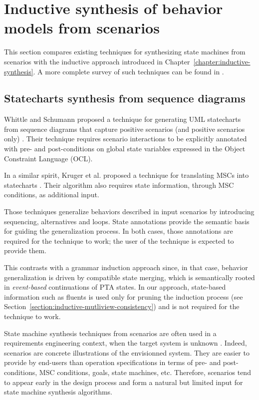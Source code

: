 \section{Inductive synthesis of behavior models from scenarios\label{section:related-from-scenarios}}

This section compares existing techniques for synthesizing state machines from scenarios with the inductive approach introduced in Chapter~\ref{chapter:inductive-synthesis}. A more complete survey of such techniques can be found in \cite{Liang:2006}.


\subsection{Statecharts synthesis from sequence diagrams}

Whittle and Schumann proposed a technique for generating UML statecharts from sequence diagrams that capture positive scenarios (and positive scenarios only) \cite{Whittle:2000}. Their technique requires scenario interactions to be explicitly annotated with pre- and post-conditions on global state variables expressed in the Object Constraint Language (OCL). 

In a similar spirit, Kruger et al. proposed a technique for translating MSCs into statecharts \cite{Kruger:2000}. Their algorithm also requires state information, through MSC conditions, as additional input.

Those techniques generalize behaviors described in input scenarios by introducing sequencing, alternatives and loops. State annotations provide the semantic basis for guiding the generalization process. In both cases, those annotations are required for the technique to work; the user of the technique is expected to provide them. 

This contrasts with a grammar induction approach since, in that case, behavior generalization is driven by compatible state merging, which is semantically rooted in \emph{event-based} continuations of PTA states. In our approach, state-based information such as fluents is used only for pruning the induction process (see Section~\ref{section:inductive-mutliview-consistency}) and is not required for the technique to work.

State machine synthesis techniques from scenarios are often used in a requirements engineering context, when the target system is unknown \cite{Weidenhaupt:1998}. Indeed, scenarios are concrete illustrations of the envisionned system. They are easier to provide by end-users than operation specifications in terms of pre- and post- conditions, MSC conditions, goals, state machines, etc. Therefore, scenarios tend to appear early in the design process and form a natural but limited input for state machine synthesis algorithms. 

